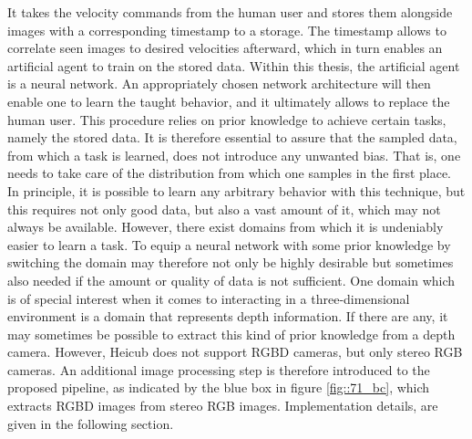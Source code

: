 It takes the velocity commands from the human user and stores them alongside images with a corresponding timestamp to a storage. The timestamp allows to correlate seen images to desired velocities afterward, which in turn enables an artificial agent to train on the stored data. Within this thesis, the artificial agent is a neural network. An appropriately chosen network architecture will then enable one to learn the taught behavior, and it ultimately allows to replace the human user. This procedure relies on prior knowledge to achieve certain tasks, namely the stored data. It is therefore essential to assure that the sampled data, from which a task is learned, does not introduce any unwanted bias. That is, one needs to take care of the distribution from which one samples in the first place. In principle, it is possible to learn any arbitrary behavior with this technique, but this requires not only good data, but also a vast amount of it, which may not always be available. However, there exist domains from which it is undeniably easier to learn a task. To equip a neural network with some prior knowledge by switching the domain may therefore not only be highly desirable but sometimes also needed if the amount or quality of data is not sufficient. One domain which is of special interest when it comes to interacting in a three-dimensional environment is a domain that represents depth information. If there are any, it may sometimes be possible to extract this kind of prior knowledge from a depth camera. However, Heicub does not support RGBD cameras, but only stereo RGB cameras. An additional image processing step is therefore introduced to the proposed pipeline, as indicated by the blue box in figure \ref{fig::71_bc}, which extracts RGBD images from stereo RGB images. Implementation details, are given in the following section.
\FloatBarrier

